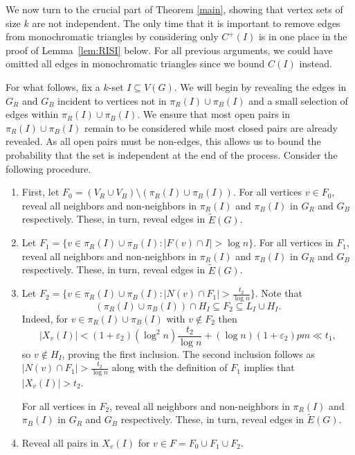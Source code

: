 \documentclass{article}
\begin{document}
We now turn to the crucial part of Theorem \ref{main}, showing that vertex sets of size $k$ are not independent.  The only time that it is important to remove edges from monochromatic triangles by considering only $C^+(I)$ is in one place in the proof of Lemma~\ref{lem:RISI} below. For all previous arguments, we could have omitted all edges in monochromatic triangles since we bound $C(I)$ instead.


For what follows, fix a $k$-set $I \subseteq V(G)$.   
We will begin by revealing the edges in $G_R$ and $G_B$ incident to vertices not in $\pi_R(I) \cup \pi_B(I)$ and a small selection of edges within $\pi_R(I) \cup \pi_B(I)$. We ensure that most open pairs in $\pi_R(I) \cup \pi_B(I)$ remain to be considered while most closed pairs are already revealed. As all open pairs must be non-edges, this allows us to bound the probability that 
the set is independent at the end of the process.  
Consider the following procedure.  
\begin{enumerate} 
\item First, let $F_0= (V_R\cup V_B)\setminus (\pi_R(I) \cup \pi_B(I))$. For all vertices $v \in F_0$, reveal all neighbors and non-neighbors in $\pi_R(I)$ and $\pi_B(I)$ in $G_R$ and $G_B$ respectively.  These, in turn, reveal edges in $\tilde{E}(G)$.  

\item Let $F_1=\{v\in \pi_R(I)\cup\pi_B(I):|F(v) \cap I|>\log n\}$. For all vertices in $F_1$, reveal all neighbors and non-neighbors in $\pi_R(I)$ and $\pi_B(I)$ in $G_R$ and $G_B$ respectively.  These, in turn, reveal edges in $\tilde{E}(G)$.

\item Let $F_2=\{v\in \pi_R(I)\cup\pi_B(I):|N(v)\cap F_1|>\frac{t_2}{\log n}\}$. Note that 
\[(\pi_R(I)\cup\pi_B(I)) \cap H_I\subseteq F_2\subseteq L_I\cup H_I.\]   Indeed, for $v \in \pi_R(I) \cup \pi_B(I)$ with $v \not\in F_2$ then \[
|X_v(I)| < (1+\varepsilon_2)(\log^2 n)\frac{t_2}{\log n} + (\log n) (1 + \varepsilon_2)p{m} \ll t_1,
\]
so $v \not\in H_I$, proving the first inclusion.  The second inclusion follows as $|N(v) \cap F_1| > \frac{t_2}{\log n}$ along with the definition of $F_1$ implies that $|X_v(I)| > t_2$.

For all vertices in $F_2$, reveal all neighbors and non-neighbors in $\pi_R(I)$ and $\pi_B(I)$ in $G_R$ and $G_B$ respectively.  These, in turn, reveal edges in $\tilde{E}(G)$.

\item Reveal all pairs in $X_v(I)$ for $v\in F=F_0\cup F_1\cup F_2$.
\end{enumerate} 
\end{document}

